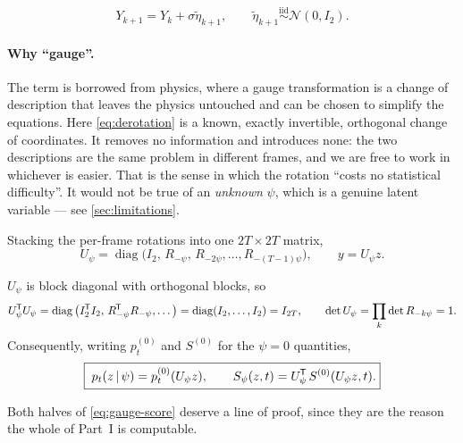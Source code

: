 \documentclass[11pt,a4paper]{article}
\newcommand{\N}{\mathcal{N}}
\newcommand{\given}{\,\vert\,}
\newcommand{\diag}{\operatorname{diag}}
\newcommand{\T}{^{\mkern-1.5mu\mathsf{T}}}
\begin{document}
\begin{keyresult}
\begin{equation}
 \boxed{Y_{k+1}=Y_k+\sigma\widetilde\eta_{k+1},
 \qquad \widetilde\eta_{k+1}\overset{\text{iid}}{\sim}\N(0,I_2).}
 \label{eq:gauged-rw}
\end{equation}
\end{keyresult}

\paragraph{Why ``gauge''.} The term is borrowed from physics, where a gauge transformation is a
change of description that leaves the physics untouched and can be chosen to simplify the
equations. Here \eqref{eq:derotation} is a known, exactly invertible, orthogonal change of
coordinates. It removes no information and introduces none: the two descriptions are the same
problem in different frames, and we are free to work in whichever is easier. That is the sense
in which the rotation ``costs no statistical difficulty''. It would not be true of an
\emph{unknown} $\psi$, which is a genuine latent variable --- see \cref{sec:limitations}.

Stacking the per-frame rotations into one $2T\times2T$ matrix,
\begin{equation}
 U_\psi=\diag\big(I_2,\,R_{-\psi},\,R_{-2\psi},\ldots,R_{-(T-1)\psi}\big),
 \qquad y=U_\psi z .
 \label{eq:U-psi}
\end{equation}

\begin{keyresult}
$U_\psi$ is block diagonal with orthogonal blocks, so
\begin{equation}
 U_\psi\T U_\psi
 =\diag\big(I_2\T I_2,\,R_{-\psi}\T R_{-\psi},\ldots\big)
 =\diag(I_2,\ldots,I_2)=I_{2T},
 \qquad
 \det U_\psi=\prod_{k}\det R_{-k\psi}=1 .
 \label{eq:U-orthogonal}
\end{equation}
Consequently, writing $p_t^{(0)}$ and $S^{(0)}$ for the $\psi=0$ quantities,
\begin{equation}
 \boxed{\;p_t(z\given\psi)=p_t^{(0)}(U_\psi z),
 \qquad
 S_\psi(z,t)=U_\psi\T\,S^{(0)}(U_\psi z,t).}
 \label{eq:gauge-score}
\end{equation}
\end{keyresult}

Both halves of \eqref{eq:gauge-score} deserve a line of proof, since they are the reason the
whole of Part~I is computable.
\end{document}
